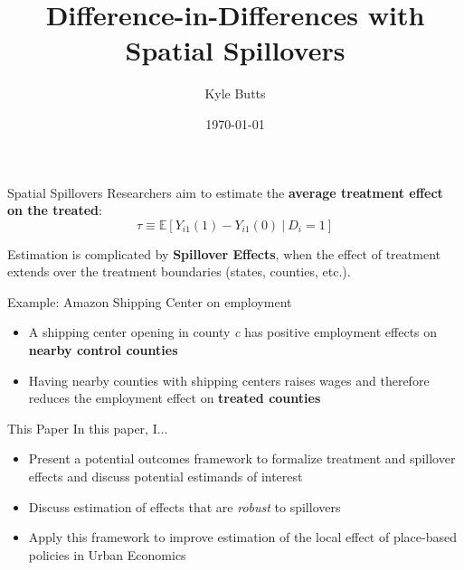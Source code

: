 \documentclass[aspectratio=169,t]{beamer}
\title{Difference-in-Differences with Spatial Spillovers}
\date{\today}
\author{Kyle Butts}
\begin{document}
\maketitle

\begin{frame}{Spatial Spillovers}
    Researchers aim to estimate the \textbf{average treatment effect on the treated}: 
    \[
        \tau \equiv \mathbb{E} \left[ Y_{i1}(1) - Y_{i1}(0) \ \vert \ D_{i} = 1 \right]
    \]
    
    Estimation is complicated by \textbf{Spillover Effects}, when the effect of treatment extends over the treatment boundaries (states, counties, etc.). 
    
    Example: Amazon Shipping Center on employment
    
    \begin{itemize}
        \item A shipping center opening in county \textit{c} has positive employment effects on \textbf{nearby control counties}
        
        \item Having nearby counties with shipping centers raises wages and therefore reduces the employment effect on \textbf{treated counties}
    \end{itemize}
\end{frame}

\begin{frame}{This Paper}
    In this paper, I...

    \begin{itemize}
        \item Present a potential outcomes framework to formalize treatment and spillover effects and discuss potential estimands of interest
        
        \item Discuss estimation of effects that are \emph{robust} to spillovers
        
        \item Apply this framework to improve estimation of the local effect of place-based policies in Urban Economics 
    \end{itemize}

\end{frame}
\end{document}

